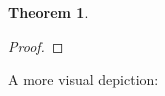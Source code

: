 
\newtheorem{theorem}{Theorem}

\begin{theorem}

\end{theorem}

\begin{proof}

\end{proof}

A more visual depiction:


\begin{align*}

\end{align*}

